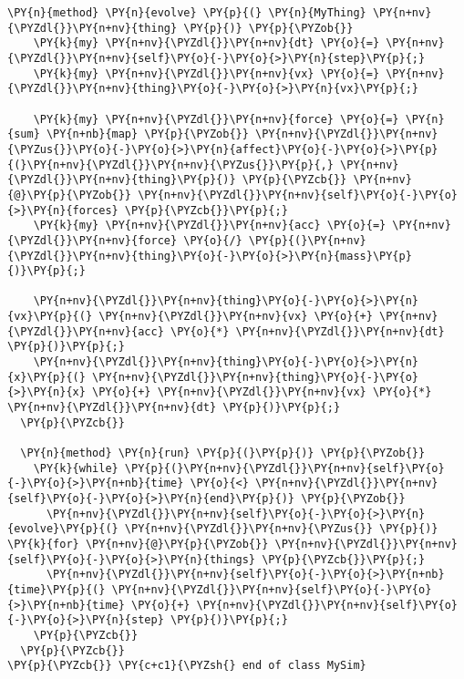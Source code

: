 \begin{Verbatim}[commandchars=\\\{\}]
  \PY{n}{method} \PY{n}{evolve} \PY{p}{(} \PY{n}{MyThing} \PY{n+nv}{\PYZdl{}}\PY{n+nv}{thing} \PY{p}{)} \PY{p}{\PYZob{}}
    \PY{k}{my} \PY{n+nv}{\PYZdl{}}\PY{n+nv}{dt} \PY{o}{=} \PY{n+nv}{\PYZdl{}}\PY{n+nv}{self}\PY{o}{-}\PY{o}{>}\PY{n}{step}\PY{p}{;}
    \PY{k}{my} \PY{n+nv}{\PYZdl{}}\PY{n+nv}{vx} \PY{o}{=} \PY{n+nv}{\PYZdl{}}\PY{n+nv}{thing}\PY{o}{-}\PY{o}{>}\PY{n}{vx}\PY{p}{;}

    \PY{k}{my} \PY{n+nv}{\PYZdl{}}\PY{n+nv}{force} \PY{o}{=} \PY{n}{sum} \PY{n+nb}{map} \PY{p}{\PYZob{}} \PY{n+nv}{\PYZdl{}}\PY{n+nv}{\PYZus{}}\PY{o}{-}\PY{o}{>}\PY{n}{affect}\PY{o}{-}\PY{o}{>}\PY{p}{(}\PY{n+nv}{\PYZdl{}}\PY{n+nv}{\PYZus{}}\PY{p}{,} \PY{n+nv}{\PYZdl{}}\PY{n+nv}{thing}\PY{p}{)} \PY{p}{\PYZcb{}} \PY{n+nv}{@}\PY{p}{\PYZob{}} \PY{n+nv}{\PYZdl{}}\PY{n+nv}{self}\PY{o}{-}\PY{o}{>}\PY{n}{forces} \PY{p}{\PYZcb{}}\PY{p}{;}
    \PY{k}{my} \PY{n+nv}{\PYZdl{}}\PY{n+nv}{acc} \PY{o}{=} \PY{n+nv}{\PYZdl{}}\PY{n+nv}{force} \PY{o}{/} \PY{p}{(}\PY{n+nv}{\PYZdl{}}\PY{n+nv}{thing}\PY{o}{-}\PY{o}{>}\PY{n}{mass}\PY{p}{)}\PY{p}{;}

    \PY{n+nv}{\PYZdl{}}\PY{n+nv}{thing}\PY{o}{-}\PY{o}{>}\PY{n}{vx}\PY{p}{(} \PY{n+nv}{\PYZdl{}}\PY{n+nv}{vx} \PY{o}{+} \PY{n+nv}{\PYZdl{}}\PY{n+nv}{acc} \PY{o}{*} \PY{n+nv}{\PYZdl{}}\PY{n+nv}{dt} \PY{p}{)}\PY{p}{;}
    \PY{n+nv}{\PYZdl{}}\PY{n+nv}{thing}\PY{o}{-}\PY{o}{>}\PY{n}{x}\PY{p}{(} \PY{n+nv}{\PYZdl{}}\PY{n+nv}{thing}\PY{o}{-}\PY{o}{>}\PY{n}{x} \PY{o}{+} \PY{n+nv}{\PYZdl{}}\PY{n+nv}{vx} \PY{o}{*} \PY{n+nv}{\PYZdl{}}\PY{n+nv}{dt} \PY{p}{)}\PY{p}{;}
  \PY{p}{\PYZcb{}}

  \PY{n}{method} \PY{n}{run} \PY{p}{(}\PY{p}{)} \PY{p}{\PYZob{}}
    \PY{k}{while} \PY{p}{(}\PY{n+nv}{\PYZdl{}}\PY{n+nv}{self}\PY{o}{-}\PY{o}{>}\PY{n+nb}{time} \PY{o}{<} \PY{n+nv}{\PYZdl{}}\PY{n+nv}{self}\PY{o}{-}\PY{o}{>}\PY{n}{end}\PY{p}{)} \PY{p}{\PYZob{}}
      \PY{n+nv}{\PYZdl{}}\PY{n+nv}{self}\PY{o}{-}\PY{o}{>}\PY{n}{evolve}\PY{p}{(} \PY{n+nv}{\PYZdl{}}\PY{n+nv}{\PYZus{}} \PY{p}{)} \PY{k}{for} \PY{n+nv}{@}\PY{p}{\PYZob{}} \PY{n+nv}{\PYZdl{}}\PY{n+nv}{self}\PY{o}{-}\PY{o}{>}\PY{n}{things} \PY{p}{\PYZcb{}}\PY{p}{;}
      \PY{n+nv}{\PYZdl{}}\PY{n+nv}{self}\PY{o}{-}\PY{o}{>}\PY{n+nb}{time}\PY{p}{(} \PY{n+nv}{\PYZdl{}}\PY{n+nv}{self}\PY{o}{-}\PY{o}{>}\PY{n+nb}{time} \PY{o}{+} \PY{n+nv}{\PYZdl{}}\PY{n+nv}{self}\PY{o}{-}\PY{o}{>}\PY{n}{step} \PY{p}{)}\PY{p}{;}
    \PY{p}{\PYZcb{}}
  \PY{p}{\PYZcb{}}
\PY{p}{\PYZcb{}} \PY{c+c1}{\PYZsh{} end of class MySim}
\end{Verbatim}
